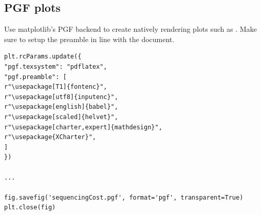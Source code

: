 \subsection{PGF plots}
Use matplotlib's PGF backend to create natively rendering plots such as . Make sure to setup the preamble in line with the document.

\begin{verbatim}
plt.rcParams.update({
"pgf.texsystem": "pdflatex",
"pgf.preamble": [
r"\usepackage[T1]{fontenc}",
r"\usepackage[utf8]{inputenc}",
r"\usepackage[english]{babel}",
r"\usepackage[scaled]{helvet}",
r"\usepackage[charter,expert]{mathdesign}",
r"\usepackage{XCharter}",
]
})

...

fig.savefig('sequencingCost.pgf', format='pgf', transparent=True)
plt.close(fig)
\end{verbatim}

\begin{figure}[t]
	\begin{center}
		\resizebox{0.55\linewidth}{!}{}
	\end{center}
	\caption[]{}
	\label{fig:sequencingcost}
\end{figure}